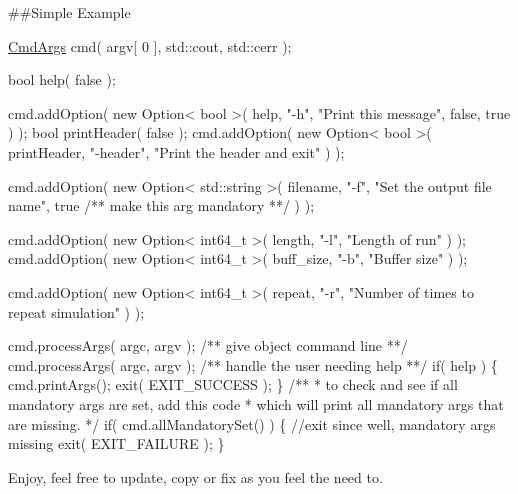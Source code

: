 \#\#\+Simple Example 
\begin{DoxyCode}
\hyperlink{class_cmd_args}{CmdArgs}  cmd( argv[ 0 ],
              std::cout,
              std::cerr );

\textcolor{keywordtype}{bool} help( \textcolor{keyword}{false} );

cmd.addOption( \textcolor{keyword}{new} Option< bool >( help,
                                    \textcolor{stringliteral}{"-h"},
                                    \textcolor{stringliteral}{"Print this message"},
                                    \textcolor{keyword}{false},
                                    \textcolor{keyword}{true} ) );
\textcolor{keywordtype}{bool} printHeader( \textcolor{keyword}{false} );
cmd.addOption( \textcolor{keyword}{new} Option< bool >( printHeader,
                                    \textcolor{stringliteral}{"-header"},
                                    \textcolor{stringliteral}{"Print the header and exit"} ) );


cmd.addOption( \textcolor{keyword}{new} Option< std::string >( filename,
                                          \textcolor{stringliteral}{"-f"},
                                          \textcolor{stringliteral}{"Set the output file name"},
                                          \textcolor{keyword}{true} \textcolor{comment}{/** make this arg mandatory **/} ) );

cmd.addOption( \textcolor{keyword}{new} Option< int64\_t >( length, 
                                      \textcolor{stringliteral}{"-l"},
                                      \textcolor{stringliteral}{"Length of run"} ) );
cmd.addOption( \textcolor{keyword}{new} Option< int64\_t >( buff\_size,
                                      \textcolor{stringliteral}{"-b"},
                                      \textcolor{stringliteral}{"Buffer size"} ) );

cmd.addOption( \textcolor{keyword}{new} Option< int64\_t >( repeat,
                                      \textcolor{stringliteral}{"-r"},
                                      \textcolor{stringliteral}{"Number of times to repeat simulation"} ) );

cmd.processArgs( argc, argv );
\textcolor{comment}{}
\textcolor{comment}{/** give object command line **/}
cmd.processArgs( argc, argv );
\textcolor{comment}{}
\textcolor{comment}{/** handle the user needing help **/}
\textcolor{keywordflow}{if}( help )
\{
   cmd.printArgs();
   exit( EXIT\_SUCCESS );
\}\textcolor{comment}{}
\textcolor{comment}{/** }
\textcolor{comment}{ * to check and see if all mandatory args are set, add this code}
\textcolor{comment}{ * which will print all mandatory args that are missing.}
\textcolor{comment}{ */}
\textcolor{keywordflow}{if}( cmd.allMandatorySet() )
\{ 
   \textcolor{comment}{//exit since well, mandatory args missing}
   exit( EXIT\_FAILURE );
\}
\end{DoxyCode}


Enjoy, feel free to update, copy or fix as you feel the need to. 